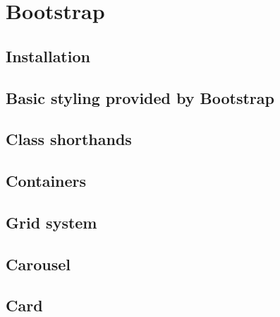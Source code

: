 \chapter{Bootstrap}

\section{Installation}

\section{Basic styling provided by Bootstrap}

\section{Class shorthands}

\section{Containers}
\label{sec:container}

\section{Grid system}

\section{Carousel}

\section{Card}
\label{sec:cards}

